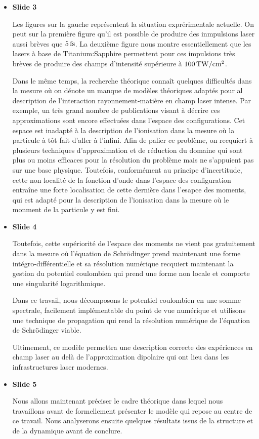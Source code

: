 \documentclass[10pt,a4paper]{article}
\begin{document}
\begin{itemize}
\item \textbf{Slide 3} \par
Les figures sur la gauche repr\'esentent la situation expr\'erimentale 
actuelle. 
On peut sur la premi\`ere figure qu'il est possible de produire
des inmpulsions laser aussi br\`eves que $5\,\rm fs$.
La deuxi\`eme figure nous montre essentiellement que les 
lasers \`a base de Titanium:Sapphire permettent pour ces impulsions 
tr\`es br\`eves de produire des champs d'intensit\'e sup\'erieure
\`a $100\,\rm TW/cm^2$.\par
Dans le m\^eme temps, la recherche th\'eorique 
conna\^it quelques difficult\'es dans la mesure o\`u 
on d\'enote un manque de mod\`eles th\'eoriques adapt\'es
pour al description de l'interaction rayonnement-mati\`ere 
en champ laser intense.
Par exemple, un tr\`es grand nombre de publications visant \`a d\'ecrire 
ces approximations sont encore effectu\'ees
dans l'espace des configurations.
Cet espace est inadapt\'e \`a la description de l'ionisation 
dans la mesure o\`u la particule \`a t\^ot fait d'aller \`a l'infini.
Afin de palier ce probl\`eme, on recquiert 
\`a plusieurs techniques d'approximation et de r\'eduction du 
domaine qui sont plus ou moins efficaces pour la r\'esolution
du probl\`eme mais ne s'appuient pas sur une base physique.
Toutefois, conform\'ement au principe d'incertitude, 
cette non localit\'e de la fonction d'onde dans l'espace des 
configuration entra\^ine une forte localisation de cette derni\`ere
dans l'esapce des moments, qui est adapt\'e pour la description 
de l'ionisation dans la mesure o\`u le monment de la particule 
y est fini.

\item \textbf{Slide 4} \par
Toutefois, cette sup\'eriorit\'e de l'espace des moments 
ne vient pas gratuitement dans la mesure o\`u 
l'\'equation de Schr\"odinger prend maintenant une forme 
int\'egro-diff\'erentielle et sa r\'esolution num\'erique 
recquiert maintenant la gestion du potentiel coulombien 
qui prend une forme non locale et comporte une  singularit\'e 
logarithmique.

Dans ce travail, nous d\'ecomposons le potentiel 
coulombien en une somme spectrale, facilement impl\'ementable 
du point de vue num\'erique et utilisons une technique 
de propagation qui rend la r\'esolution num\'erique 
de l'\'equation de Schr\"odinger viable.

Ultimement, ce mod\`ele permettra une description correcte
des exp\'eriences en champ laser au del\`a de l'approximation dipolaire 
qui ont lieu dans les infrastructures laser modernes.

\item \textbf{Slide 5}\par
Nous allons maintenant pr\'eciser le cadre th\'eorique dans
lequel nous travaillons avant de formellement pr\'esenter le mod\`ele 
qui repose au centre de ce travail.
Nous analyserons ensuite quelques r\'esultats issus de
la structure et de la dynamique avant de conclure.
\end{itemize}
\end{document}
